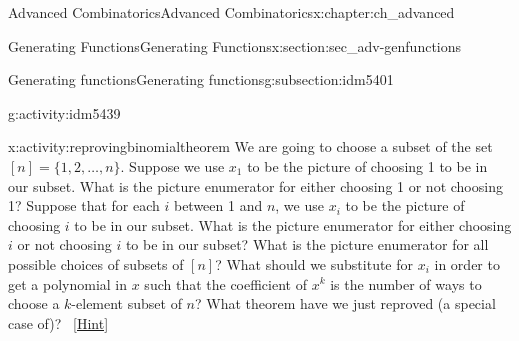 \documentclass[oneside,10pt,]{book}
\numberwithin{equation}{chapter}
\begin{document}
\begin{chapterptx}{Advanced Combinatorics}{}{Advanced Combinatorics}{}{}{x:chapter:ch_advanced}
\begin{sectionptx}{Generating Functions}{}{Generating Functions}{}{}{x:section:sec_adv-genfunctions}
\begin{subsectionptx}{Generating functions}{}{Generating functions}{}{}{g:subsection:idm5401}
\begin{activity}{}{g:activity:idm5439}
\end{activity}
\begin{activity}{}{x:activity:reprovingbinomialtheorem}%
We are going to choose a subset of the set \([n]=\{1,2,\ldots, n\}\). Suppose we use \(x_1\) to be the picture of choosing 1 to be in our subset. What is the picture enumerator for either choosing 1 or not choosing 1? Suppose that for each \(i\) between 1 and \(n\), we use \(x_i\) to be the picture of choosing \(i\) to be in our subset. What is the picture enumerator for either choosing \(i\) or not choosing \(i\) to be in our subset? What is the picture enumerator for all possible choices of subsets of \([n]\)? What should we substitute for \(x_i\) in order to get a polynomial in \(x\) such that the coefficient of \(x^k\) is the number of ways to choose a \(k\)-element subset of \(n\)? What theorem have we just reproved (a special case of)?%
\qquad~\hfill{\tiny\hyperlink{g:hint:idm5473-back}{[Hint]}}\end{activity}

\end{subsectionptx}
\end{sectionptx}
\end{chapterptx}
\end{document}
